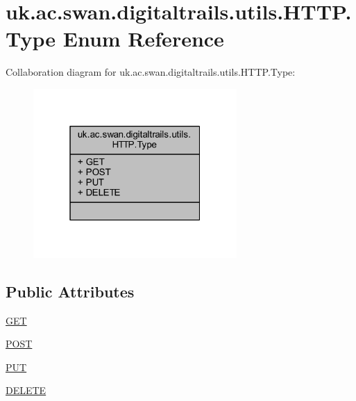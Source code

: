\hypertarget{enumuk_1_1ac_1_1swan_1_1digitaltrails_1_1utils_1_1_h_t_t_p_1_1_type}{\section{uk.\+ac.\+swan.\+digitaltrails.\+utils.\+H\+T\+T\+P.\+Type Enum Reference}
\label{enumuk_1_1ac_1_1swan_1_1digitaltrails_1_1utils_1_1_h_t_t_p_1_1_type}
}


Collaboration diagram for uk.\+ac.\+swan.\+digitaltrails.\+utils.\+H\+T\+T\+P.\+Type\+:
\nopagebreak
\begin{figure}[H]
\begin{center}
\leavevmode
\includegraphics[width=220pt]{enumuk_1_1ac_1_1swan_1_1digitaltrails_1_1utils_1_1_h_t_t_p_1_1_type__coll__graph}
\end{center}
\end{figure}
\subsection*{Public Attributes}
\begin{DoxyCompactItemize}
\item 
\hyperlink{enumuk_1_1ac_1_1swan_1_1digitaltrails_1_1utils_1_1_h_t_t_p_1_1_type_ac42012402ddc7101b26f98d4c07f6e3d}{G\+E\+T}
\item 
\hyperlink{enumuk_1_1ac_1_1swan_1_1digitaltrails_1_1utils_1_1_h_t_t_p_1_1_type_a93f55c4a4367bf1b011fcc56c14effd3}{P\+O\+S\+T}
\item 
\hyperlink{enumuk_1_1ac_1_1swan_1_1digitaltrails_1_1utils_1_1_h_t_t_p_1_1_type_ac3cbdcf63a8259524233fc7db349723f}{P\+U\+T}
\item 
\hyperlink{enumuk_1_1ac_1_1swan_1_1digitaltrails_1_1utils_1_1_h_t_t_p_1_1_type_a399ae3964d81f49f073a0e92e13fafa7}{D\+E\+L\+E\+T\+E}
\end{DoxyCompactItemize}


